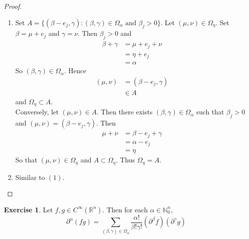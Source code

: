 \documentclass[12pt]{amsart}
\theoremstyle{definition}
\newtheorem{ex}[definition]{Exercise}
\newcommand{\p}{\partial}
\newcommand{\al}{\alpha}
\newcommand{\be}{\beta}
\newcommand{\gam}{\gamma}
\newcommand{\Om}{\Omega}
\newcommand{\N}{\mathbb{N}}
\newcommand{\R}{\mathbb{R}}
\begin{document}
	\begin{proof}\
		\begin{enumerate}
			\item Set $A = \{(\be - e_j, \gam): (\be, \gam) \in \Om_{\al} \text{ and } \be_j > 0\}$. Let $(\mu, \nu) \in \Om_{\eta}$. Set $\be = \mu + e_j$ and $\gam = \nu$. Then $\be_j > 0$ and 
			\begin{align*}
				\be + \gam 
				& = \mu + e_j + \nu \\
				& = \eta + e_j \\
				& = \al 
			\end{align*}
			So $(\be, \gam) \in \Om_{\al}$. Hence
			\begin{align*}
				(\mu, \nu) 
				& = (\be - e_j, \gam) \\
				& \in A
			\end{align*}
			and $\Om_{\eta} \subset A$. \\
			Conversely, let $(\mu, \nu) \in A$. Then there exists $(\be, \gam) \in \Om_{\al}$ such that $\be_j > 0$ and $(\mu, \nu) = (\be - e_j, \gam)$. Then 
			\begin{align*}
				\mu + \nu
				&= \be - e_j + \gam \\
				& = \al - e_j \\
				& = \eta 
			\end{align*}
			So that $(\mu, \nu) \in \Om_{\eta}$ and $A \subset \Om_{\eta}$. Thus $\Om_{\eta} = A$.
			\item Similar to $(1)$.
		\end{enumerate}
	\end{proof}

	\begin{ex}
		Let $f, g \in C^{\infty}(\R^n)$. Then for each $\al \in \N_0^n$, 
		$$\p^{\al}(fg) = \sum_{(\be, \gam) \in \Om_{\al}} \frac{\al!}{\be !\gam!}( \p^{\be} f) (\p^{\gam}g)$$  
	\end{ex}
\end{document}
